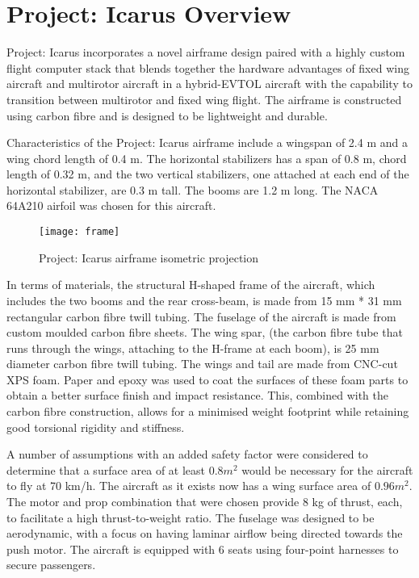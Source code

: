 \section{Project: Icarus Overview}
\label{sec:overview}

Project: Icarus incorporates a novel airframe design paired with a highly custom 
flight computer stack that blends together the hardware advantages of fixed wing 
aircraft and multirotor aircraft in a hybrid-EVTOL aircraft with the capability to 
transition  between multirotor and fixed wing flight. The airframe is constructed 
using carbon  fibre and is designed to be lightweight and durable.

Characteristics of the Project: Icarus airframe include a wingspan of 2.4 m and
a wing chord length of 0.4 m. The horizontal stabilizers has a span of 0.8 m, chord
length of 0.32 m, and the two vertical stabilizers, one attached at each end of the
horizontal stabilizer, are 0.3 m tall. The booms are 1.2 m long. The NACA 64A210  
airfoil was chosen for this aircraft.

\begin{figure}[ht]
        \centering
        \texttt{[image: frame]}
        \caption{Project: Icarus airframe isometric projection}
\end{figure}

In terms of materials, the structural H-shaped frame of the aircraft, which includes
the two booms and the rear cross-beam, is made from 15 mm * 31 mm rectangular carbon
fibre twill tubing. The fuselage of the aircraft is made from custom moulded carbon
fibre sheets. The wing spar, (the carbon fibre tube that runs through the wings,
attaching to the H-frame at each boom), is 25 mm diameter carbon fibre twill tubing.
The wings and tail are made from CNC-cut XPS foam. Paper and epoxy was used to
coat the surfaces of these foam parts to obtain a better surface finish and impact
resistance. This, combined with the carbon fibre construction, allows for a minimised
weight footprint while retaining good torsional rigidity and stiffness.

A number of assumptions with an added safety factor were considered to determine that
a surface area of at least $0.8 m^2$ would be necessary for the aircraft to fly at
70 km/h. The aircraft as it exists now has a wing surface area of $0.96 m^2$. The
motor and prop combination that were chosen provide 8 kg of thrust, each, to
facilitate a high thrust-to-weight ratio. The fuselage was designed to be
aerodynamic, with a focus on having laminar airflow being directed towards the push
motor. The aircraft is equipped with 6 seats using four-point harnesses to secure
passengers.

